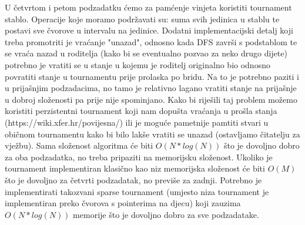 U četvrtom i petom podzadatku ćemo za pamćenje vinjeta koristiti tournament stablo. Operacije koje moramo podržavati su: suma svih jedinica u stablu te postavi sve čvorove u intervalu na jedinice. Dodatni implementacijski detalj koji treba promotriti je vraćanje "unazad", odnosno kada DFS završi s podstablom te se vraća nazad u roditelja (kako bi se eventualno pozvao za neko drugo dijete) potrebno je vratiti se u stanje u kojemu je roditelj originalno bio odnosno povratiti stanje u tournamentu prije prolaska po bridu. Na to je potrebno paziti i u prijašnjim podzadacima, no tamo je relativno lagano vratiti stanje na prijašnje u dobroj složenosti pa prije nije spominjano. Kako bi riješili taj problem možemo koristiti perzistentni tournament koji nam dopušta vraćanja u prošla stanja (https://wiki.xfer.hr/povijesna/) ili je moguće pametnije pamtiti stvari u običnom tournamentu kako bi bilo lakše vratiti se unazad (ostavljamo čitatelju za vježbu). Sama složenost algoritma će biti $O(N * log(N))$ što je dovoljno dobro za oba podzadatka, no treba pripaziti na memorijsku složenost. Ukoliko je tournament implementiran klasično kao niz memorijska složenost će biti $O(M)$ što je dovoljno za četvrti podzadatak, no previše za zadnji. Potrebno je implementirati takozvani sparse tournament (umjesto niza tournament je implementiran preko čvorova s pointerima na djecu) koji zauzima $O(N * log(N))$ memorije što je dovoljno dobro za sve podzadatake.